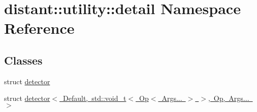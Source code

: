 \hypertarget{namespacedistant_1_1utility_1_1detail}{}\section{distant\+:\+:utility\+:\+:detail Namespace Reference}
\label{namespacedistant_1_1utility_1_1detail}
\subsection*{Classes}
\begin{DoxyCompactItemize}
\item 
struct \mbox{\hyperlink{structdistant_1_1utility_1_1detail_1_1detector}{detector}}
\item 
struct \mbox{\hyperlink{structdistant_1_1utility_1_1detail_1_1detector_3_01_default_00_01std_1_1void__t_3_01_op_3_01_arg04e1ee669e2093134af6db72a2dfc0d6}{detector$<$ Default, std\+::void\+\_\+t$<$ Op$<$ Args... $>$ $>$, Op, Args... $>$}}
\end{DoxyCompactItemize}
